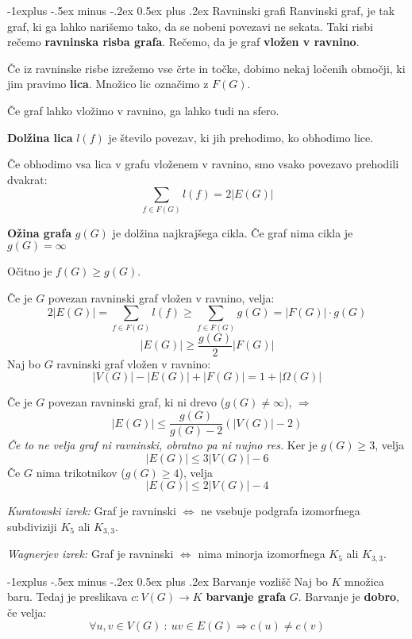 \documentclass[a4paper,9pt]{extarticle}
\makeatletter
\renewcommand{\subsection}{\@startsection{subsection}{2}{0mm}%
                                {-1explus -.5ex minus -.2ex}%
                                {0.5ex plus .2ex}%
                                {\normalfont\normalsize\bfseries}}
\makeatother
\begin{document}
\begin{multicols}{3}
\subsection{Ravninski grafi}
Ranvinski graf, je tak graf, ki ga lahko narišemo tako, da se nobeni povezavi ne sekata. Taki risbi
rečemo \textbf{ravninska risba grafa}. Rečemo, da je graf \textbf{vložen v ravnino}.

Če iz ravninske risbe izrežemo vse črte in točke, dobimo nekaj ločenih območji, ki jim pravimo \textbf{lica}.
Množico lic označimo z $F(G)$.

Če graf lahko vložimo v ravnino, ga lahko tudi na sfero.

\textbf{Dolžina lica} $l(f)$ je število povezav, ki jih prehodimo, ko obhodimo lice.

Če obhodimo vsa lica v grafu vloženem v ravnino, smo vsako povezavo prehodili dvakrat:
\[\sum_{f \in F(G)} l(f) = 2|E(G)| \]


\textbf{Ožina grafa} $g(G)$ je dolžina najkrajšega cikla. Če graf nima cikla je $g(G) = \infty$

Očitno je $f(G) \geq g(G)$. 

Če je $G$ povezan ravninski graf vložen v ravnino, velja:
\[2|E(G)| = \sum_{f \in F(G)} l(f) \geq \sum_{f \in F(G)} g(G) = |F(G)|\cdot g(G) \]
\[ |E(G)| \geq \frac{g(G)}{2} |F(G)| \]
Naj bo $G$ ravninski graf vložen v ravnino:
\[|V(G)| - |E(G)| + |F(G)| = 1+|\Omega(G)| \]

Če je $G$ povezan ravninski graf, ki ni drevo ($ g(G) \neq \infty $), $\Rightarrow$
\[ |E(G)| \leq \frac{g(G)}{g(G)-2}(|V(G)| -2) \]
\emph{Če to ne velja graf ni ravninski, obratno pa ni nujno res.}
Ker je $g(G) \geq 3$, velja
\[ |E(G)| \leq 3|V(G)| - 6\]
Če $G$ nima trikotnikov ($g(G) \geq 4$), velja
\[ |E(G)| \leq 2|V(G)| - 4\]

\emph{Kuratowski izrek:} Graf je ravninski $\Leftrightarrow$ ne vsebuje podgrafa izomorfnega subdiviziji
$K_5$ ali $K_{3,3}$.

\emph{Wagnerjev izrek:} Graf je ravninski $\Leftrightarrow$ nima minorja izomorfnega $K_5$ ali $K_{3,3}$.

\subsection{Barvanje vozlišč}
Naj bo $K$ množica baru. Tedaj je preslikava $c:V(G) \to K$ \textbf{barvanje grafa} $G$.
Barvanje je \textbf{dobro}, če velja:
\[\forall u,v \in V(G)\ :\ uv \in E(G) \Rightarrow c(u) \neq c(v)  \]


\end{multicols}
\end{document}
